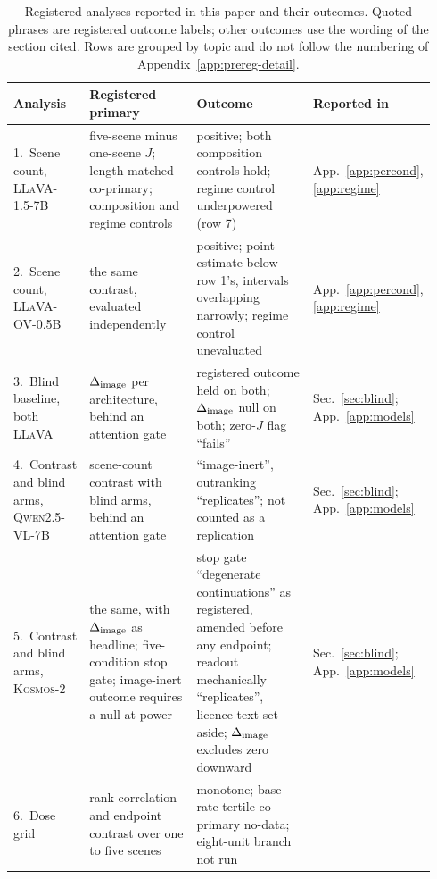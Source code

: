 \begin{table}[htbp]
\caption{Registered analyses reported in this paper and their outcomes. Quoted phrases are registered
outcome labels; other outcomes use the wording of the section cited.
Rows are grouped by topic and do not follow the numbering of Appendix~\ref{app:prereg-detail}.}
\label{tab:registry}
\begin{center}
\footnotesize
\setlength{\tabcolsep}{4pt}
\begin{tabular}{@{}p{0.17\linewidth}p{0.305\linewidth}p{0.345\linewidth}p{0.12\linewidth}@{}}
\toprule
\raggedright Analysis & \raggedright Registered primary & \raggedright Outcome &
\raggedright Reported in \tabularnewline
\midrule
\raggedright 1.\ Scene count, \textsc{LLaVA-1.5-7B} &
\raggedright five-scene minus one-scene $J$; length-matched co-primary; composition and regime controls &
\raggedright positive; both composition controls hold; regime control underpowered (row 7) &
\raggedright App.~\ref{app:percond}, \ref{app:regime} \tabularnewline\addlinespace[1pt]
\raggedright 2.\ Scene count, \textsc{LLaVA-OV-0.5B} &
\raggedright the same contrast, evaluated independently &
\raggedright positive; point estimate below row 1's, intervals overlapping narrowly; regime control unevaluated &
\raggedright App.~\ref{app:percond}, \ref{app:regime} \tabularnewline\addlinespace[1pt]
\raggedright 3.\ Blind baseline, both \textsc{LLaVA} &
\raggedright $\Delta_{\mathrm{image}}$ per architecture, behind an attention gate &
\raggedright registered outcome held on both; $\Delta_{\mathrm{image}}$ null on both; zero-$J$ flag ``fails'' &
\raggedright Sec.~\ref{sec:blind}; App.~\ref{app:models} \tabularnewline\addlinespace[1pt]
\raggedright 4.\ Contrast and blind arms, \textsc{Qwen2.5-VL-7B} &
\raggedright scene-count contrast with blind arms, behind an attention gate &
\raggedright ``image-inert'', outranking ``replicates''; not counted as a replication &
\raggedright Sec.~\ref{sec:blind}; App.~\ref{app:models} \tabularnewline\addlinespace[1pt]
\raggedright 5.\ Contrast and blind arms, \textsc{Kosmos-2} &
\raggedright the same, with $\Delta_{\mathrm{image}}$ as headline; five-condition stop gate; image-inert outcome requires a null at power &
\raggedright stop gate ``degenerate continuations'' as registered, amended before any endpoint;
readout mechanically ``replicates'', licence text set aside; $\Delta_{\mathrm{image}}$ excludes zero downward &
\raggedright Sec.~\ref{sec:blind}; App.~\ref{app:models} \tabularnewline
\midrule
\raggedright 6.\ Dose grid &
\raggedright rank correlation and endpoint contrast over one to five scenes &
\raggedright monotone; base-rate-tertile co-primary no-data; eight-unit branch not run &

\end{tabular}
\end{center}
\end{table}
